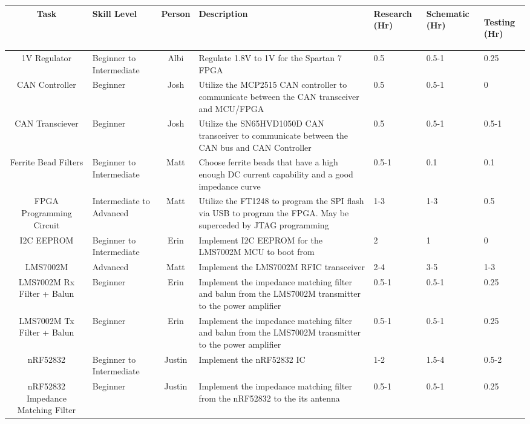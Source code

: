 \documentclass[crop=false]{standalone}
\begin{document}
\begin{landscape}
\begin{longtable}[c]{|c|m{2cm}|c|m{4cm}|m{2cm}|m{2cm}|m{2cm}|}
            \hline
            Task & Skill Level & Person & Description & \centering Research (Hr) & \centering Schematic (Hr) & \begin{center} Testing (Hr) \end{center} \\ \hline 
            \raggedright 1V Regulator & \raggedright Beginner to Intermediate & Albi & \raggedright Regulate 1.8V to 1V for the Spartan 7 FPGA & 0.5 & 0.5-1 & 0.25 \\ \hline
            \raggedright CAN Controller & Beginner & Josh & \raggedright Utilize the MCP2515 CAN controller to communicate between the CAN transceiver and MCU/FPGA & 0.5 & 0.5-1 & 0   \\ \hline
            CAN Transciever & Beginner & Josh & \raggedright Utilize the SN65HVD1050D CAN transceiver to communicate between the CAN bus and CAN Controller & 0.5 & 0.5-1 & 0.5-1    \\ \hline
            Ferrite Bead Filters & \raggedright Beginner to Intermediate & Matt & \raggedright Choose ferrite beads that have a high enough DC current capability and a good impedance curve & 0.5-1 & 0.1 & 0.1 \\ \hline
            FPGA Programming Circuit & \raggedright Intermediate to Advanced & Matt & \raggedright Utilize the FT1248 to program the SPI flash via USB to program the FPGA. May be superceded by JTAG programming & 1-3 & 1-3 & 0.5 \\ \hline
            I2C EEPROM & \raggedright Beginner to Intermediate & Erin & \raggedright Implement I2C EEPROM for the LMS7002M MCU to boot from & 2 & 1 & 0  \\ \hline
            LMS7002M & Advanced & Matt & \raggedright Implement the LMS7002M RFIC transceiver & 2-4 & 3-5 & 1-3  \\ \hline
            LMS7002M Rx Filter + Balun & Beginner & Erin & \raggedright Implement the impedance matching filter and balun from the LMS7002M transmitter to the power amplifier & 0.5-1 & 0.5-1 & 0.25 \\ \hline
            LMS7002M Tx Filter + Balun & Beginner & Erin & \raggedright Implement the impedance matching filter and balun from the LMS7002M transmitter to the power amplifier & 0.5-1 & 0.5-1 & 0.25 \\ \hline
            nRF52832 & \raggedright Beginner to Intermediate & Justin & Implement the nRF52832 IC &  1-2 & 1.5-4 & 0.5-2 \\ \hline
            nRF52832 Impedance Matching Filter & Beginner & Justin & \raggedright Implement the impedance matching filter from the nRF52832 to the its antenna & 0.5-1 & 0.5-1 & 0.25 \\ \hline

\end{longtable}
\end{landscape}
\end{document}
